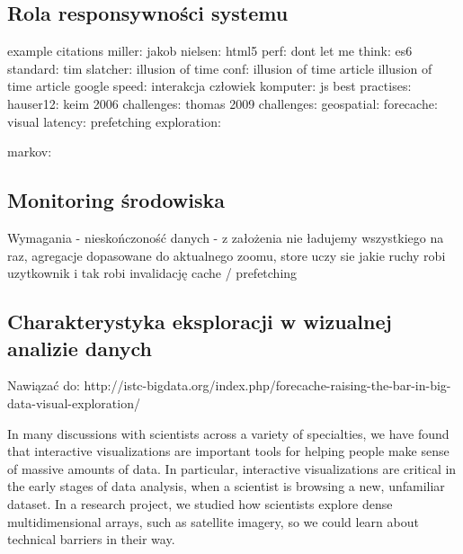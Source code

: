 \subsection{Rola responsywności systemu}
example citations
miller: \cite{Miller1968}
jakob nielsen: \cite{jakob1993usability}
html5 perf: \cite{html5-perf}
dont let me think: \cite{dont-let-me-think}
es6 standard: \cite{es6-standard}
tim slatcher: \cite{conference}
illusion of time conf: \cite{illusion-of-time}
illusion of time article \cite{why-performance-matters-part1}
illusion of time article \cite{why-performance-matters-part2}
google speed: \cite{google-speed}
interakcja człowiek komputer: \cite{interakcja}
js best practises: \cite{js-best-practises}
hauser12: \cite{Hauser12VisTutorial}
keim 2006 challenges: \cite{keim2006challenges}
thomas 2009 challenges: \cite{thomas2009challenges}
geospatial: \cite{sample2010tile}
forecache: \cite{forecache}
visual latency: \cite{effect-interactive-latency}
prefetching exploration: \cite{prefetching-visual-data-exploration}

markov: \cite{lee2002adaptation}
\subsection{Monitoring środowiska}

Wymagania - nieskończoność danych - z założenia nie ładujemy wszystkiego na raz,
agregacje dopasowane do aktualnego zoomu, store uczy sie jakie ruchy robi uzytkownik i tak robi invalidację cache / prefetching



\subsection{Charakterystyka eksploracji w wizualnej analizie danych}
Nawiązać do:
http://istc-bigdata.org/index.php/forecache-raising-the-bar-in-big-data-visual-exploration/


In many discussions with scientists across a variety of specialties, we have found that interactive visualizations are important tools for helping people make sense of massive amounts of data. In particular, interactive visualizations are critical in the early stages of data analysis, when a scientist is browsing a new, unfamiliar dataset. In a research project, we studied how scientists explore dense multidimensional arrays, such as satellite imagery, so we could learn about technical barriers in their way.

